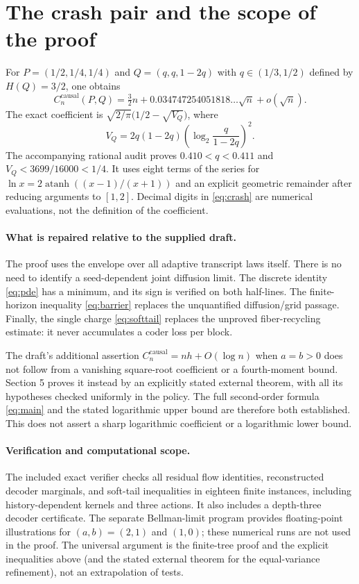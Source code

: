 \documentclass[11pt,a4paper]{article}
\newcommand{\causal}{\mathrm{causal}}
\begin{document}
\section{The crash pair and the scope of the proof}
For $P=(1/2,1/4,1/4)$ and $Q=(q,q,1-2q)$ with
$q\in(1/3,1/2)$ defined by $H(Q)=3/2$, one obtains
\begin{equation}\label{eq:crash}
\boxed{C_n^{\causal}(P,Q)
=\tfrac32n+0.034747254051818\ldots\sqrt n+o(\sqrt n).}
\end{equation}
The exact coefficient is
$\sqrt{2/\pi}\bigl(1/2-\sqrt{V_Q}\bigr)$, where
\[
V_Q=2q(1-2q)\left(\log_2\frac q{1-2q}\right)^2.
\]
The accompanying rational audit proves $0.410<q<0.411$ and
$V_Q<3699/16000<1/4$. It uses eight terms of the series for
$\ln x=2\operatorname{atanh}((x-1)/(x+1))$ and an explicit geometric
remainder after reducing arguments to $[1,2]$. Decimal digits in
\eqref{eq:crash} are numerical evaluations, not the definition of the
coefficient.

\paragraph{What is repaired relative to the supplied draft.}
The proof uses the envelope over all adaptive transcript laws itself.
There is no need to identify a seed-dependent joint diffusion limit.
The discrete identity \eqref{eq:pde} has a minimum, and its sign is
verified on both half-lines. The finite-horizon inequality
\eqref{eq:barrier} replaces the unquantified diffusion/grid passage.
Finally, the single charge \eqref{eq:softtail} replaces the unproved
fiber-recycling estimate: it never accumulates a coder loss per block.

The draft's additional assertion $C_n^{\causal}=nh+O(\log n)$ when
$a=b>0$ does not follow from a vanishing square-root coefficient or a
fourth-moment bound. Section 5 proves it instead by an explicitly stated
external theorem, with all its hypotheses checked uniformly in the
policy. The full second-order formula \eqref{eq:main} and the stated
logarithmic upper bound are therefore both established. This does not
assert a sharp logarithmic coefficient or a logarithmic lower bound.

\paragraph{Verification and computational scope.}
The included exact verifier checks all residual flow identities,
reconstructed decoder marginals, and soft-tail inequalities in eighteen
finite instances, including history-dependent kernels and three
actions. It also includes a depth-three decoder certificate.
The separate Bellman-limit program provides floating-point
illustrations for $(a,b)=(2,1)$ and $(1,0)$; these numerical runs are
not used in the proof. The universal argument is the finite-tree proof
and the explicit inequalities above (and the stated external theorem for
the equal-variance refinement), not an extrapolation of tests.
\end{document}
